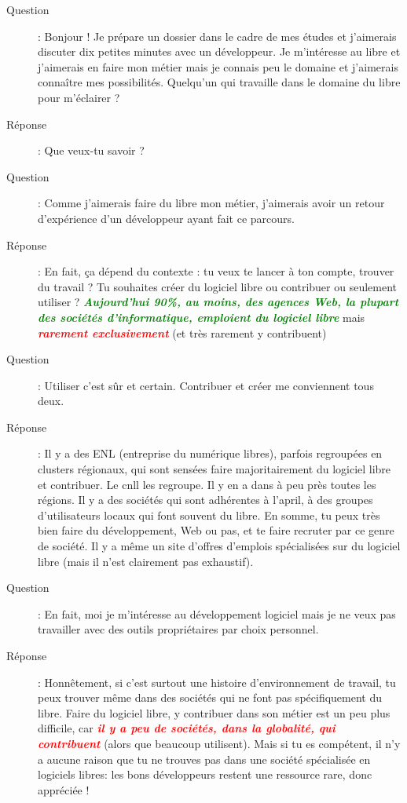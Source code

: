 \documentclass[a4paper,12pt, draft]{report}
\newcommand{\goodPoint}[1]{\textcolor{green}{\textbf{\textit{#1}}}}
\newcommand{\badPoint}[1]{\textcolor{red}{\textbf{\textit{#1}}}}
\begin{document}
\begin{description}
\item [Question]:  Bonjour ! Je prépare un dossier dans le cadre de mes études et j'aimerais discuter dix petites minutes avec un développeur. Je m'intéresse au libre et j'aimerais en faire mon métier mais je connais peu le domaine et j'aimerais connaître mes possibilités. Quelqu'un qui travaille dans le domaine du libre pour m'éclairer ?
\item [Réponse]:  Que veux-tu savoir ?
\item [Question]:  Comme j'aimerais faire du libre mon métier, j'aimerais avoir un retour d'expérience d'un développeur ayant fait ce parcours.
\item [Réponse]:  En fait, ça dépend du contexte : tu veux te lancer à ton compte, trouver du travail ? Tu souhaites créer du logiciel libre ou contribuer ou seulement utiliser ? \goodPoint{Aujourd'hui 90\%, au moins, des agences Web, la plupart des sociétés d'informatique, emploient du logiciel libre} mais \badPoint{rarement exclusivement} (et très rarement y contribuent)
\item [Question]:  Utiliser c'est sûr et certain. Contribuer et créer me conviennent tous deux.
\item [Réponse]:  Il y a des ENL (entreprise du numérique libres), parfois regroupées en clusters régionaux, qui sont sensées faire majoritairement du logiciel libre et contribuer. Le cnll\cite{cnll} les regroupe. Il y en a dans à peu près toutes les régions. Il y a des sociétés qui sont adhérentes à l'april, à des groupes d'utilisateurs locaux qui font souvent du libre. En somme, tu peux très bien faire du développement, Web ou pas, et te faire recruter par ce genre de société. Il y a même un site\cite{lolix} d'offres d'emplois spécialisées sur du logiciel libre (mais il n'est clairement pas exhaustif).
\item [Question]:  En fait, moi je m'intéresse au développement logiciel mais je ne veux pas travailler avec des outils propriétaires par choix personnel.
\item [Réponse]:  Honnêtement, si c'est surtout une histoire d'environnement de travail, tu peux trouver même dans des sociétés qui ne font pas spécifiquement du libre. Faire du logiciel libre, y contribuer dans son métier est un peu plus difficile, car \badPoint{il y a peu de sociétés, dans la globalité, qui contribuent} (alors que beaucoup utilisent). Mais si tu es compétent, il n'y a aucune raison que tu ne trouves pas dans une société spécialisée en logiciels libres: les bons développeurs restent une ressource rare, donc appréciée !

\end{description}
\end{document}
